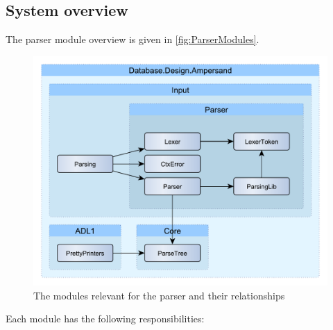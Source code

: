 
\subsection{System overview}
\label{design:system-overview}
  The parser module overview is given in \autoref{fig:ParserModules}.
  \begin{figure}[ht]%
    \centering
    \includegraphics[width=0.7\columnwidth]{Figures/ParserModules}
    \caption{The modules relevant for the parser and their relationships}
    \label{fig:ParserModules}
  \end{figure}%
  Each module has the following responsibilities:
